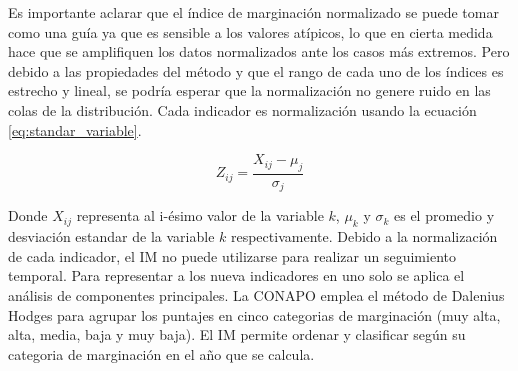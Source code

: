 Es importante aclarar que el índice de marginación normalizado se puede tomar como una guía ya que es sensible a los valores atípicos, lo que en cierta medida hace que se amplifiquen los datos normalizados ante los casos más extremos. Pero debido a las propiedades del método y que el rango de cada uno de los índices es estrecho y lineal, se podría esperar que la normalización no genere ruido en las colas de la distribución. Cada indicador es normalización usando la ecuación \ref{eq:standar_variable}.

\begin{equation}
    Z_{ij} = \frac{X_{ij}-\mu_j}{\sigma_j} \label{eq:standar_variable}
\end{equation}

Donde $X_{ij}$ representa al i-ésimo valor de la variable $k$, $\mu_k$ y $\sigma_k$ es el promedio y desviación estandar de la variable $k$ respectivamente. Debido a la normalización de cada indicador, el IM no puede utilizarse para realizar un seguimiento temporal. Para representar a los nueva indicadores en uno solo se aplica el análisis de componentes principales. La CONAPO emplea el método de Dalenius Hodges\cite{Dalenius_1959} para agrupar los puntajes en cinco categorias de marginación (muy alta, alta, media, baja y muy baja). El IM permite ordenar y clasificar según su categoria de marginación en el año que se calcula.


